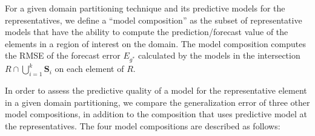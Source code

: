 For a given domain partitioning technique and its predictive models for the representatives, we define a ``model composition'' as the subset of representative models that have the ability to compute the prediction/forecast value of the elements in a region of interest on the domain. The model composition computes the RMSE of the forecast error $E_{g^{*}}$ calculated by the models in the intersection $R \cap \bigcup_{i=1}^{k} \mathbf{S}_{i}$ on each element of $R$.  

In order to assess the predictive quality of a model for the representative element in a given domain partitioning, we compare the generalization error of three other model compositions, in addition to the composition that uses predictive model at the representatives. The four model compositions are described as follows: 

